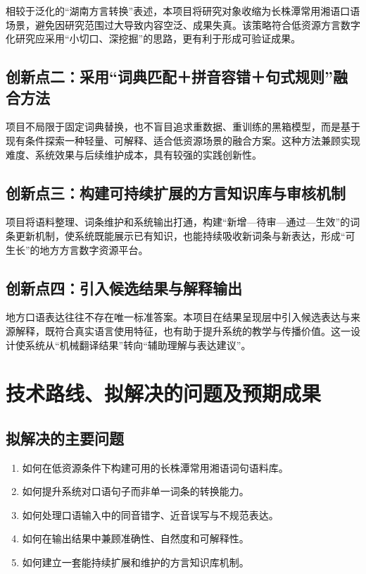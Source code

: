 \documentclass[12pt,a4paper]{ctexart}
\begin{document}
相较于泛化的“湖南方言转换”表述，本项目将研究对象收缩为长株潭常用湘语口语场景，避免因研究范围过大导致内容空泛、成果失真。该策略符合低资源方言数字化研究应采用“小切口、深挖掘”的思路，更有利于形成可验证成果。

\subsection{创新点二：采用“词典匹配＋拼音容错＋句式规则”融合方法}

项目不局限于固定词典替换，也不盲目追求重数据、重训练的黑箱模型，而是基于现有条件探索一种轻量、可解释、适合低资源场景的融合方案。这种方法兼顾实现难度、系统效果与后续维护成本，具有较强的实践创新性。

\subsection{创新点三：构建可持续扩展的方言知识库与审核机制}

项目将语料整理、词条维护和系统输出打通，构建“新增—待审—通过—生效”的词条更新机制，使系统既能展示已有知识，也能持续吸收新词条与新表达，形成“可生长”的地方方言数字资源平台。

\subsection{创新点四：引入候选结果与解释输出}

地方口语表达往往不存在唯一标准答案。本项目在结果呈现层中引入候选表达与来源解释，既符合真实语言使用特征，也有助于提升系统的教学与传播价值。这一设计使系统从“机械翻译结果”转向“辅助理解与表达建议”。

\section{技术路线、拟解决的问题及预期成果}

\subsection{拟解决的主要问题}

\begin{enumerate}
  \item 如何在低资源条件下构建可用的长株潭常用湘语词句语料库。
  \item 如何提升系统对口语句子而非单一词条的转换能力。
  \item 如何处理口语输入中的同音错字、近音误写与不规范表达。
  \item 如何在输出结果中兼顾准确性、自然度和可解释性。
  \item 如何建立一套能持续扩展和维护的方言知识库机制。
\end{enumerate}
\end{document}

